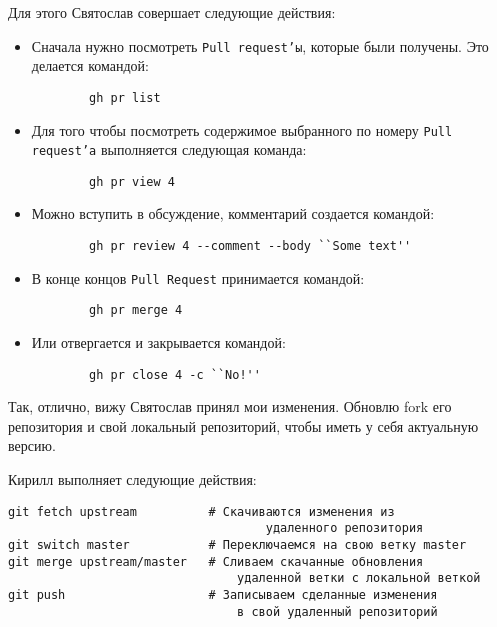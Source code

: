 \documentclass[14pt,a4paper]{article}
\begin{document}
Для этого Святослав совершает следующие действия:
\begin{itemize}
	\item Сначала нужно посмотреть \texttt{Pull request'ы}, которые были получены.
		Это делается командой:
		\begin{verbatim}
		gh pr list
		\end{verbatim}
	\item Для того чтобы посмотреть содержимое выбранного по номеру \texttt{Pull request'а}
		выполняется следующая команда:
		\begin{verbatim}
		gh pr view 4
		\end{verbatim}
	\item Можно вступить в обсуждение, комментарий создается командой:
		\begin{verbatim}
		gh pr review 4 --comment --body ``Some text''
		\end{verbatim}
	\item В конце концов \texttt{Pull Request} принимается командой:
		\begin{verbatim}
		gh pr merge 4 
		\end{verbatim}
	\item Или отвергается и закрывается командой:
		\begin{verbatim}
		gh pr close 4 -c ``No!''
		\end{verbatim}
\end{itemize}



 Так, отлично, вижу Святослав принял мои изменения. Обновлю fork его 
репозитория и свой локальный репозиторий, чтобы иметь у себя актуальную версию.

Кирилл выполняет следующие действия:
\begin{verbatim}
git fetch upstream			# Скачиваются изменения из 
									удаленного репозитория
git switch master			# Переключаемся на свою ветку master
git merge upstream/master	# Сливаем скачанные обновления 
								удаленной ветки с локальной веткой
git push					# Записываем сделанные изменения
								в свой удаленный репозиторий
\end{verbatim}
\end{document}
